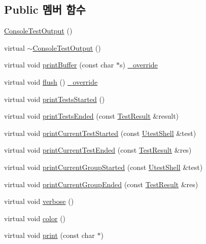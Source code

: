 \subsection*{Public 멤버 함수}
\begin{DoxyCompactItemize}
\item 
\hyperlink{class_console_test_output_aba92f1523fddc9581b06248d8e5efab2}{Console\+Test\+Output} ()
\item 
virtual \hyperlink{class_console_test_output_aaa109548b259f683c8a9c06ee686d01d}{$\sim$\+Console\+Test\+Output} ()
\item 
virtual void \hyperlink{class_console_test_output_a8b83bd531b9e38a5dd9c61e14bf1636c}{print\+Buffer} (const char $\ast$s) \hyperlink{_cpp_u_test_config_8h_a049bea15dd750e15869863c94c1efc3b}{\+\_\+override}
\item 
virtual void \hyperlink{class_console_test_output_a9fde218af86a81b79f82b86f3ddeabe5}{flush} () \hyperlink{_cpp_u_test_config_8h_a049bea15dd750e15869863c94c1efc3b}{\+\_\+override}
\item 
virtual void \hyperlink{class_test_output_a1c2b129bfdc2b392ffa618864707dd89}{print\+Tests\+Started} ()
\item 
virtual void \hyperlink{class_test_output_acc5ba82a215510b66f5f294258686dd4}{print\+Tests\+Ended} (const \hyperlink{class_test_result}{Test\+Result} \&result)
\item 
virtual void \hyperlink{class_test_output_aa3e637e450766d2d1a6090f2bab8bf08}{print\+Current\+Test\+Started} (const \hyperlink{class_utest_shell}{Utest\+Shell} \&test)
\item 
virtual void \hyperlink{class_test_output_a67acd3c53695126b4728c7da0d2b0b51}{print\+Current\+Test\+Ended} (const \hyperlink{class_test_result}{Test\+Result} \&res)
\item 
virtual void \hyperlink{class_test_output_afe801c9e014df78dd6cd5e199ba8c6e0}{print\+Current\+Group\+Started} (const \hyperlink{class_utest_shell}{Utest\+Shell} \&test)
\item 
virtual void \hyperlink{class_test_output_a037b2a87826c7f59e7353cb137deacae}{print\+Current\+Group\+Ended} (const \hyperlink{class_test_result}{Test\+Result} \&res)
\item 
virtual void \hyperlink{class_test_output_a2ae0a8d48809abb33b5ba47c56fdc3ad}{verbose} ()
\item 
virtual void \hyperlink{class_test_output_ae8d23f2d3de1d9d47d8139d54fb89640}{color} ()
\item 
virtual void \hyperlink{class_test_output_a321b5c489a90374cb61c34fe5d2253ef}{print} (const char $\ast$)

\end{DoxyCompactItemize}
